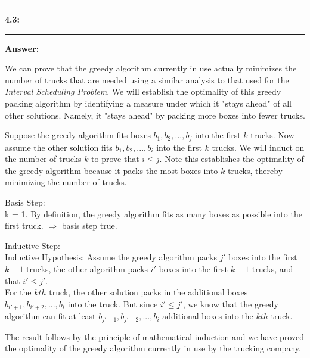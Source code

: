 \documentclass[11pt]{article}
\newcommand\question[2]{\vspace{.25in}\hrule\textbf{#1: #2}\vspace{.5em}\hrule\vspace{.10in}}
\newcommand\answer{\vspace{.10in}\textbf{Answer: }}
\begin{document}
\raggedright
\newcommand\NAME{Stewart Dulaney}  %
\newcommand\SID{904-064-791}     %
\newcommand\HWNUM{3}              %

\question{4.3}{}

\answer

We can prove that the greedy algorithm currently in use actually minimizes the number of trucks that are needed using a similar analysis to that used for the \textit{Interval Scheduling Problem}. We will establish the optimality of this greedy packing algorithm by identifying a measure under which it "stays ahead" of all other solutions. Namely, it "stays ahead" by packing more boxes into fewer trucks.\newline

Suppose the greedy algorithm fits boxes $b_1, b_2, ..., b_j$ into the first $k$ trucks. Now assume the other solution fits $b_1, b_2, ..., b_i$ into the first $k$ trucks. We will induct on the number of trucks $k$ to prove that $i \leq j$. Note this establishes the optimality of the greedy algorithm because it packs the most boxes into $k$ trucks, thereby minimizing the number of trucks.\newline

Basis Step:\\
k = 1. By definition, the greedy algorithm fits as many boxes as possible into the first truck. $\Rightarrow$ basis step true.\newline

Inductive Step:\\
Inductive Hypothesis: Assume the greedy algorithm packs $j'$ boxes into the first $k - 1$ trucks, the other algorithm packs $i'$ boxes into the first $k - 1$ trucks, and that $i' \leq j'$.\\
For the $kth$ truck, the other solution packs in the additional boxes $b_{i' + 1}, b_{i' + 2}, ..., b_{i}$ into the truck. But since $i' \leq j'$, we know that the greedy algorithm can fit at least $b_{j' + 1}, b_{j' + 2}, ..., b_{i}$ additional boxes into the $kth$ truck. 

The result follows by the principle of mathematical induction and we have proved the optimality of the greedy algorithm currently in use by the trucking company.

\clearpage
\end{document}

